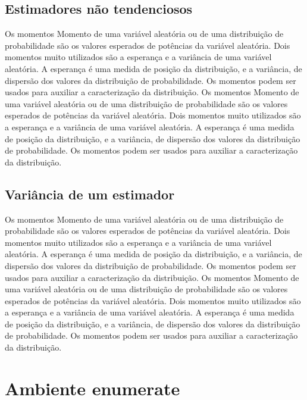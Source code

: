 \documentclass[12pt]{article}
\begin{document}
\subsection{Estimadores não tendenciosos}
Os momentos Momento de uma variável aleatória ou de uma distribuição de probabilidade são os valores esperados de potências da variável aleatória. Dois momentos muito utilizados são a esperança e a variância de uma variável aleatória. A esperança é uma medida de posição da distribuição, e a variância, de dispersão dos valores da distribuição de probabilidade. Os momentos podem ser usados para auxiliar a caracterização da distribuição.
Os momentos Momento de uma variável aleatória ou de uma distribuição de probabilidade são os valores esperados de potências da variável aleatória. Dois momentos muito utilizados são a esperança e a variância de uma variável aleatória. A esperança é uma medida de posição da distribuição, e a variância, de dispersão dos valores da distribuição de probabilidade. Os momentos podem ser usados para auxiliar a caracterização da distribuição.

 
\subsection{Variância de um estimador}
Os momentos Momento de uma variável aleatória ou de uma distribuição de probabilidade são os valores esperados de potências da variável aleatória. Dois momentos muito utilizados são a esperança e a variância de uma variável aleatória. A esperança é uma medida de posição da distribuição, e a variância, de dispersão dos valores da distribuição de probabilidade. Os momentos podem ser usados para auxiliar a caracterização da distribuição.
Os momentos Momento de uma variável aleatória ou de uma distribuição de probabilidade são os valores esperados de potências da variável aleatória. Dois momentos muito utilizados são a esperança e a variância de uma variável aleatória. A esperança é uma medida de posição da distribuição, e a variância, de dispersão dos valores da distribuição de probabilidade. Os momentos podem ser usados para auxiliar a caracterização da distribuição.


\newpage 


\section{Ambiente enumerate}
\end{document}
